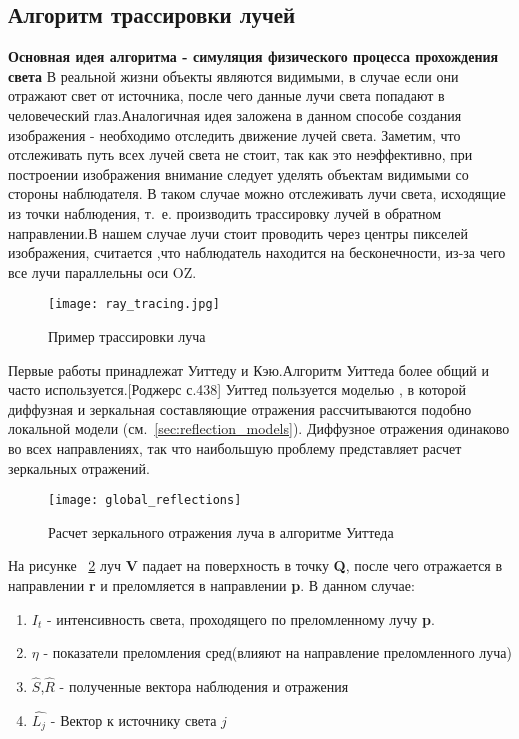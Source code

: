 \subsection{Алгоритм трассировки лучей}
\label{sec:ray_tracing}
\textbf{Основная идея алгоритма - симуляция физического процесса прохождения света} \newline
В реальной жизни объекты являются видимыми, в случае если они отражают свет от источника, после чего данные лучи света попадают в человеческий глаз.Аналогичная идея заложена в данном способе создания изображения - необходимо отследить движение лучей света.
Заметим, что отслеживать путь всех лучей света не стоит, так как это неэффективно, при построении изображения внимание следует уделять объектам видимыми со стороны наблюдателя.
В таком случае можно отслеживать лучи света, исходящие из точки наблюдения, т.~е. производить трассировку лучей в обратном направлении.В нашем случае лучи стоит проводить через центры пикселей изображения,
считается ,что наблюдатель находится на бесконечности, из-за чего все лучи параллельны оси OZ.\cite{Rodgers,modern_ray_tracing}

\begin{figure}[h]
	\centering
	\texttt{[image: ray\_tracing.jpg]}
	\caption{Пример трассировки луча}
	\label{fig:alg_ray_tracing}
\end{figure} 

Первые работы принадлежат Уиттеду и Кэю.Алгоритм Уиттеда более общий и часто используется.[Роджерс с.438]
Уиттед пользуется моделью , в которой диффузная и зеркальная составляющие отражения рассчитываются подобно локальной модели (см.~\ref{sec:reflection_models}).
Диффузное отражения одинаково во всех направлениях, так что наибольшую проблему представляет расчет зеркальных отражений.\cite{Rodgers}

\begin{figure}[h]
	\centering
	\texttt{[image: global\_reflections]}
	\caption{Расчет зеркального отражения луча в алгоритме Уиттеда}
	\label{fig:global_reflections}
\end{figure} 

На рисунке ~\ref{fig:global_reflections} луч \textbf{V} падает на поверхность в точку \textbf{Q}, после чего отражается в направлении \textbf{r} и преломляется
в направлении \textbf{p}.
В данном случае:
\begin{enumerate}
	\item $I_t$ - интенсивность света, проходящего по преломленному лучу \textbf{p}.
	\item $\eta$ - показатели преломления сред(влияют на направление преломленного луча)
	\item $\hat{S}$,$\hat{R}$ - полученные вектора наблюдения и отражения
	\item $\hat{L_j}$ - Вектор к источнику света $j$

\end{enumerate}

